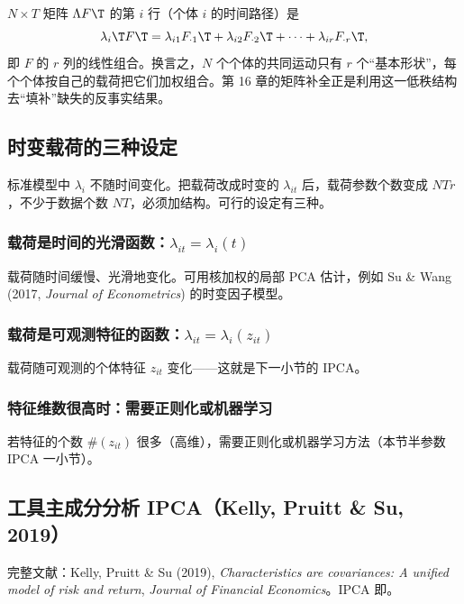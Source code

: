 $N\times T$ 矩阵 $\Lambda F\T$ 的第 $i$ 行（个体 $i$ 的时间路径）是
\[
\lambda_i\T F\T=\lambda_{i1}F_{\cdot1}\T+\lambda_{i2}F_{\cdot2}\T+\dots+\lambda_{ir}F_{\cdot r}\T ,
\]
即 $F$ 的 $r$ 列的线性组合。换言之，$N$ 个个体的共同运动只有 $r$ 个“基本形状”，每个个体按自己的载荷把它们加权组合。第 16 章的矩阵补全正是利用这一低秩结构去“填补”缺失的反事实结果。

\subsection{时变载荷的三种设定}

标准模型中 $\lambda_i$ 不随时间变化。把载荷改成时变的 $\lambda_{it}$ 后，载荷参数个数变成 $NTr$，不少于数据个数 $NT$，必须加结构。可行的设定有三种。

\subsubsection{载荷是时间的光滑函数：\texorpdfstring{$\lambda_{it}=\lambda_i(t)$}{lambda\_it = lambda\_i(t)}}

载荷随时间缓慢、光滑地变化。可用核加权的局部 PCA 估计，例如 Su \& Wang (2017, \emph{Journal of Econometrics}) 的时变因子模型。\tagext

\subsubsection{载荷是可观测特征的函数：\texorpdfstring{$\lambda_{it}=\lambda_i(z_{it})$}{lambda\_it = lambda\_i(z\_it)}}

载荷随可观测的个体特征 $z_{it}$ 变化——这就是下一小节的 IPCA。

\subsubsection{特征维数很高时：需要正则化或机器学习}

若特征的个数 $\#(z_{it})$ 很多（高维），需要正则化或机器学习方法（本节半参数 IPCA 一小节）。

\subsection{工具主成分分析 IPCA（Kelly, Pruitt \& Su, 2019）}

完整文献：Kelly, Pruitt \& Su (2019), \emph{Characteristics are covariances: A unified model of risk and return}, \emph{Journal of Financial Economics}。IPCA 即。

